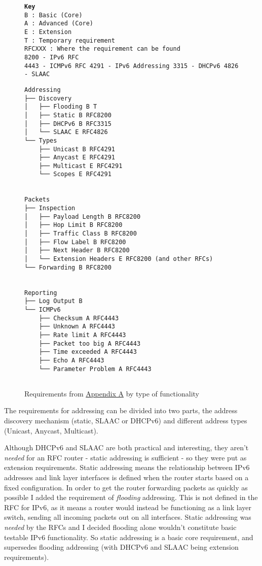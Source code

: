 \documentclass[12pt,a4paper,twoside,openany]{report}
\begin{document}
\begin{figure}
\texttt{\textbf{Key} \\
B : Basic (Core) \\
A : Advanced (Core) \\
E : Extension \\
T : Temporary requirement \\
RFCXXX : Where the requirement can be found \\
   8200 - IPv6 RFC\cite{ipv6_rfc} \\
   4443 - ICMPv6 RFC\cite{icmpv6_rfc}
   4291 - IPv6 Addressing\cite{ipv6_rfc_adr}
   3315 - DHCPv6\cite{dhcpv6_rfc}
   4826 - SLAAC\cite{slaac_rfc}
}
\begin{lstlisting}[style=tree]
Addressing
├── Discovery
│   ├── Flooding B T 
│   ├── Static B RFC8200
│   ├── DHCPv6 B RFC3315
│   └── SLAAC E RFC4826
└── Types
    ├── Unicast B RFC4291
    ├── Anycast E RFC4291
    ├── Multicast E RFC4291
    └── Scopes E RFC4291


Packets
├── Inspection
│   ├── Payload Length B RFC8200
│   ├── Hop Limit B RFC8200
│   ├── Traffic Class B RFC8200
│   ├── Flow Label B RFC8200
│   ├── Next Header B RFC8200
│   └── Extension Headers E RFC8200 (and other RFCs)
└── Forwarding B RFC8200


Reporting
├── Log Output B 
└── ICMPv6  
    ├── Checksum A RFC4443
    ├── Unknown A RFC4443
    ├── Rate limit A RFC4443
    ├── Packet too big A RFC4443
    ├── Time exceeded A RFC4443
    ├── Echo A RFC4443
    └── Parameter Problem A RFC4443
 
\end{lstlisting}
\caption{Requirements from \hyperref[appendix::requirements]{Appendix A} by type of functionality}
\label{fig::requirements}
\end{figure}

\bigskip

The requirements for addressing can be divided into two parts, the address discovery mechanism (static, SLAAC\cite{slaac_rfc} or DHCPv6\cite{dhcpv6_rfc}) and different address types (Unicast, Anycast, Multicast).  

Although DHCPv6 and SLAAC are both practical and interesting, they aren't \textit{needed} for an RFC router - static addressing is sufficient - so they were put as extension requirements.  Static addressing means the relationship between IPv6 addresses and link layer interfaces is defined when the router starts based on a fixed configuration. In order to get the router forwarding packets as quickly as possible I added the requirement of \textit{flooding} addressing.  This is not defined in the RFC for IPv6, as it means a router would instead be functioning as a link layer switch, sending all incoming packets out on all interfaces. Static addressing was \textit{needed} by the RFCs and I decided flooding alone wouldn't constitute basic testable IPv6 functionality. So static addressing is a basic core requirement, and supersedes flooding addressing (with DHCPv6 and SLAAC being extension requirements).
\end{document}
